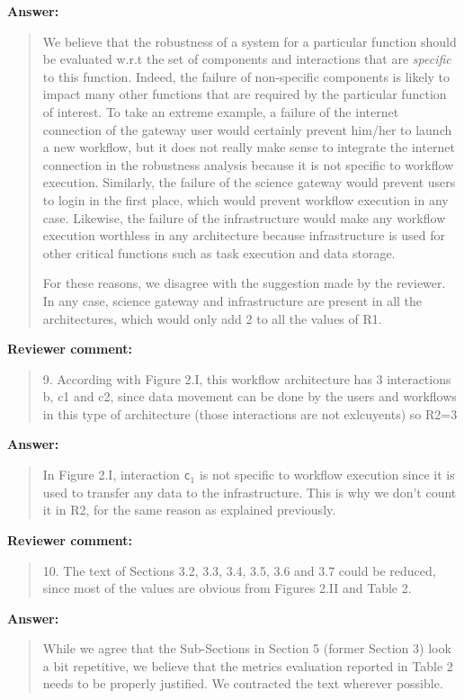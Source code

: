 \documentclass[a4]{article}
\newenvironment{review}%
{\textbf{Reviewer comment:}\begin{quote}}%
{\end{quote}}%
\newenvironment{answer}%
{\textbf{Answer:}\begin{small}\begin{quote}}%
{\end{quote}\end{small}}%
\begin{document}
\begin{answer}
  We believe that the robustness of a system for a particular function
  should be evaluated w.r.t the set of components and interactions
  that are \emph{specific} to this function. Indeed, the failure of
  non-specific components is likely to impact many other functions
  that are required by the particular function of interest. To take an
  extreme example, a failure of the internet connection of the gateway
  user would certainly prevent him/her to launch a new workflow, but
  it does not really make sense to integrate the internet connection
  in the robustness analysis because it is not specific to workflow
  execution. Similarly, the failure of the science gateway would
  prevent users to login in the first place, which would prevent
  workflow execution in any case. Likewise, the failure of the
  infrastructure would make any workflow execution worthless in any
  architecture because infrastructure is used for other critical
  functions such as task execution and data storage. 

  For these reasons, we disagree with the suggestion made by the
  reviewer. In any case, science gateway and infrastructure are
  present in all the architectures, which would only add 2 to all the
  values of R1.
\end{answer}

\begin{review}
9. According with Figure 2.I, this workflow architecture has 3
interactions b, c1 and c2, since data movement can be done by the
users and workflows in this type of architecture (those interactions
are not exlcuyents) so R2=3
\end{review}

\begin{answer}
  In Figure 2.I, interaction \texttt{c$_1$} is not specific to
  workflow execution since it is used to transfer any data to the
  infrastructure. This is why we don't count it in R2, for the same
  reason as explained previously.
\end{answer}

\begin{review}
  10. The text of Sections 3.2, 3.3, 3.4, 3.5, 3.6 and 3.7 could be
  reduced, since most of the values are obvious from Figures 2.II and
  Table 2.
\end{review}

\begin{answer}
  While we agree that the Sub-Sections in Section 5 (former Section 3) look a bit
  repetitive, we believe that the metrics evaluation reported in Table 2 needs to be
  properly justified. We contracted the text wherever possible.
\end{answer}
\end{document}
